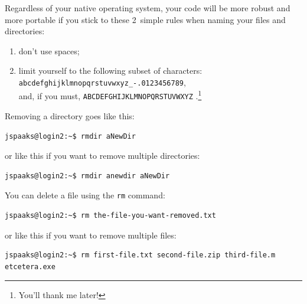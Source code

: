Regardless of your native operating system, your code will be more robust and more portable if you stick to these 2~simple rules when naming your files and directories:
\begin{enumerate}
\item{don't use spaces;}
\item{limit yourself to the following subset of characters:\\ \lstinline[style=bashinline]{abcdefghijklmnopqrstuvwxyz_-.0123456789},\\ and, if you must, \lstinline[style=bashinline]{ABCDEFGHIJKLMNOPQRSTUVWXYZ} .}\footnote{You'll thank me later!}
\end{enumerate}



Removing a directory goes like this:
\begin{lstlisting}[style=basic,style=bash]
jspaaks@login2:~$ rmdir aNewDir
\end{lstlisting}
or like this if you want to remove multiple directories:
\begin{lstlisting}[style=basic,style=bash]
jspaaks@login2:~$ rmdir anewdir aNewDir
\end{lstlisting}


You can delete a file using the \texttt{rm} command:
\begin{lstlisting}[style=basic,style=bash]
jspaaks@login2:~$ rm the-file-you-want-removed.txt
\end{lstlisting}
or like this if you want to remove multiple files:
\begin{lstlisting}[style=basic,style=bash]
jspaaks@login2:~$ rm first-file.txt second-file.zip third-file.m etcetera.exe
\end{lstlisting}

